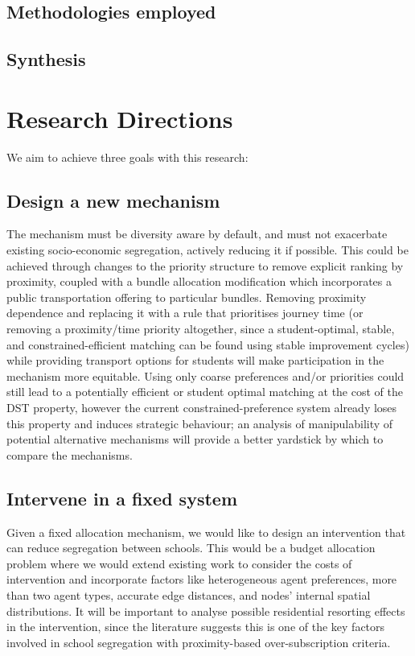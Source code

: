 \documentclass{article}
\begin{document}
\begin{multicols}{2}
\subsection{Methodologies employed}

\subsection{Synthesis}

\section{Research Directions}
We aim to achieve three goals with this research:

\subsection{Design a new mechanism}
The mechanism must be diversity aware by default, and must not exacerbate existing socio-economic segregation, actively reducing it if possible. This could be achieved through changes to the priority structure to remove explicit ranking by proximity, coupled with a bundle allocation modification which incorporates a public transportation offering to particular bundles. Removing proximity dependence and replacing it with a rule that prioritises journey time (or removing a proximity/time priority altogether, since a student-optimal, stable, and constrained-efficient matching can be found using stable improvement cycles) while providing transport options for students will make participation in the mechanism more equitable. Using only coarse preferences and/or priorities could still lead to a potentially efficient or student optimal matching at the cost of the DST property, however the current constrained-preference system already loses this property and induces strategic behaviour; an analysis of manipulability of potential alternative mechanisms will provide a better yardstick by which to compare the mechanisms.

\subsection{Intervene in a fixed system}
Given a fixed allocation mechanism, we would like to design an intervention that can reduce segregation between schools. This would be a budget allocation problem where we would extend existing work to consider the costs of intervention and incorporate factors like heterogeneous agent preferences, more than two agent types, accurate edge distances, and nodes' internal spatial distributions. It will be important to analyse possible residential resorting effects in the intervention, since the literature suggests this is one of the key factors involved in school segregation with proximity-based over-subscription criteria. 


\end{multicols}
\end{document}
